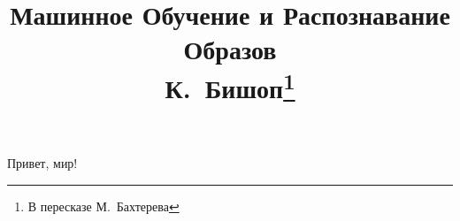 \documentclass[14pt]{extarticle}
\title{%
  \textbf{Машинное Обучение и Распознавание Образов}\\
  {\large К.~Бишоп\footnote{В пересказе М.~Бахтерева}}}
\begin{document}
\maketitle
\tableofcontents

Привет, мир!
\end{document}
